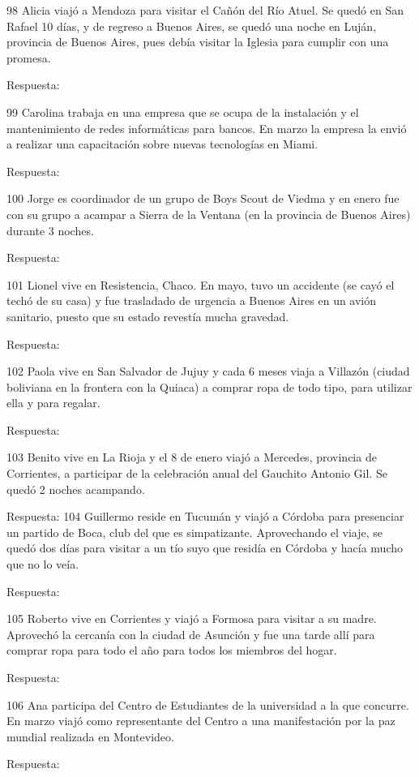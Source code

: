 \documentclass[
  openany]{book}
\begin{document}
98 Alicia viajó a Mendoza para visitar el Cañón del Río Atuel. Se quedó en San Rafael 10 días, y de regreso a Buenos Aires, se quedó una noche en Luján, provincia de Buenos Aires, pues debía visitar la Iglesia para cumplir con una promesa.

Respuesta:

99 Carolina trabaja en una empresa que se ocupa de la instalación y el mantenimiento de redes informáticas para bancos. En marzo la empresa la envió a realizar una capacitación sobre nuevas tecnologías en Miami.

Respuesta:

100 Jorge es coordinador de un grupo de Boys Scout de Viedma y en enero fue con su grupo a acampar a Sierra de la Ventana (en la provincia de Buenos Aires) durante 3 noches.

Respuesta:

101 Lionel vive en Resistencia, Chaco. En mayo, tuvo un accidente (se cayó el techó de su casa) y fue trasladado de urgencia a Buenos Aires en un avión sanitario, puesto que su estado revestía mucha gravedad.

Respuesta:

102 Paola vive en San Salvador de Jujuy y cada 6 meses viaja a Villazón (ciudad boliviana en la frontera con la Quiaca) a comprar ropa de todo tipo, para utilizar ella y para regalar.

Respuesta:

103 Benito vive en La Rioja y el 8 de enero viajó a Mercedes, provincia de Corrientes, a participar de la celebración anual del Gauchito Antonio Gil. Se quedó 2 noches acampando.

Respuesta: 104 Guillermo reside en Tucumán y viajó a Córdoba para presenciar un partido de Boca, club del que es simpatizante. Aprovechando el viaje, se quedó dos días para visitar a un tío suyo que residía en Córdoba y hacía mucho que no lo veía.

Respuesta:

105 Roberto vive en Corrientes y viajó a Formosa para visitar a su madre. Aprovechó la cercanía con la ciudad de Asunción y fue una tarde allí para comprar ropa para todo el año para todos los miembros del hogar.

Respuesta:

106 Ana participa del Centro de Estudiantes de la universidad a la que concurre. En marzo viajó como representante del Centro a una manifestación por la paz mundial realizada en Montevideo.

Respuesta:
\end{document}
